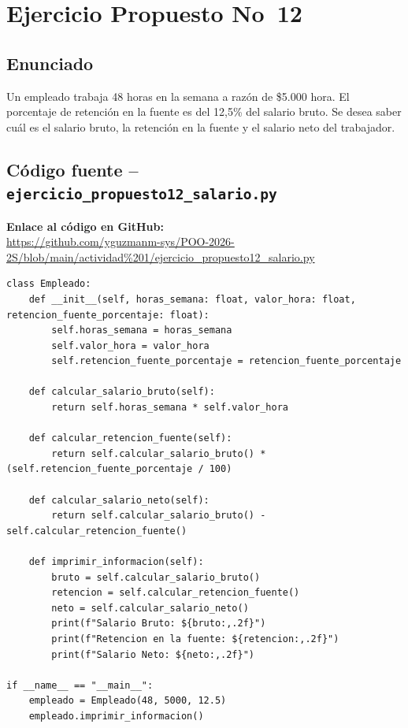\documentclass[12pt,a4paper]{article}
\begin{document}
\section{Ejercicio Propuesto No~12}

\subsection{Enunciado}
Un empleado trabaja 48 horas en la semana a raz\'on de \$5.000 hora. El porcentaje de retenci\'on en la fuente es del 12,5\% del salario bruto. Se desea saber cu\'al es el salario bruto, la retenci\'on en la fuente y el salario neto del trabajador.

\subsection{C\'odigo fuente -- \texttt{ejercicio\_propuesto12\_salario.py}}
\noindent \textbf{Enlace al c\'odigo en GitHub:}\\
\url{https://github.com/yguzmanm-sys/POO-2026-2S/blob/main/actividad%201/ejercicio_propuesto12_salario.py}\\[0.3cm]

\begin{lstlisting}[style=pythonstyle, caption={Salario Empleado -- ejercicio\_propuesto12\_salario.py}]
class Empleado:
    def __init__(self, horas_semana: float, valor_hora: float, retencion_fuente_porcentaje: float):
        self.horas_semana = horas_semana
        self.valor_hora = valor_hora
        self.retencion_fuente_porcentaje = retencion_fuente_porcentaje

    def calcular_salario_bruto(self):
        return self.horas_semana * self.valor_hora

    def calcular_retencion_fuente(self):
        return self.calcular_salario_bruto() * (self.retencion_fuente_porcentaje / 100)

    def calcular_salario_neto(self):
        return self.calcular_salario_bruto() - self.calcular_retencion_fuente()

    def imprimir_informacion(self):
        bruto = self.calcular_salario_bruto()
        retencion = self.calcular_retencion_fuente()
        neto = self.calcular_salario_neto()
        print(f"Salario Bruto: ${bruto:,.2f}")
        print(f"Retencion en la fuente: ${retencion:,.2f}")
        print(f"Salario Neto: ${neto:,.2f}")

if __name__ == "__main__":
    empleado = Empleado(48, 5000, 12.5)
    empleado.imprimir_informacion()
\end{lstlisting}
\end{document}
